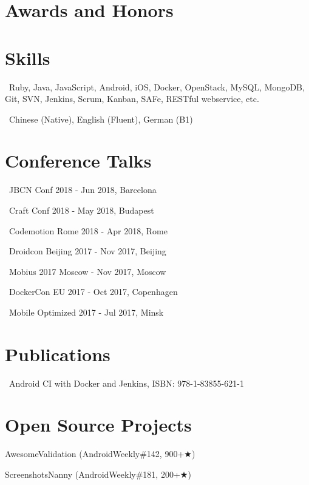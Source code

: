 \documentclass{cv}
\begin{document}



\section*{Awards and Honors}



\section*{Skills}

\faCode\ Ruby, Java, JavaScript, Android, iOS, Docker, OpenStack, MySQL, MongoDB, Git, SVN, Jenkins, Scrum, Kanban, SAFe, RESTful webservice, etc.

\faLanguage\ Chinese (Native), English (Fluent), German (B1)
~\\

\section*{Conference Talks}

\faMicrophone\ JBCN Conf 2018 - Jun 2018, Barcelona

\faMicrophone\ Craft Conf 2018 - May 2018, Budapest

\faMicrophone\ Codemotion Rome 2018 - Apr 2018, Rome

\faMicrophone\ Droidcon Beijing 2017 - Nov 2017, Beijing

\faMicrophone\ Mobius 2017 Moscow - Nov 2017, Moscow

\faMicrophone\ DockerCon EU 2017 - Oct 2017, Copenhagen

\faMicrophone\ Mobile Optimized 2017 - Jul 2017, Minsk
~\\

\section*{Publications}

\faBook\ Android CI with Docker and Jenkins, ISBN: 978-1-83855-621-1
~\\

\section*{Open Source Projects}

AwesomeValidation (AndroidWeekly\#142, 900+{\DejaVuSans ★})

ScreenshotsNanny (AndroidWeekly\#181, 200+{\DejaVuSans ★})
\end{document}
